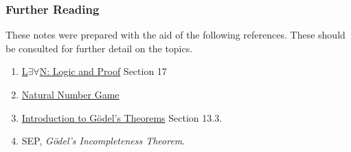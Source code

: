 \documentclass{beamer}
\theoremstyle{indentDefn} \newtheorem{defn}[]{Definition}
\begin{document}
\begin{frame}
	\frametitle{Further Reading}
	
  These notes were prepared with the aid of the following references. 
  These should be consulted for further detail on the topics. 

\begin{enumerate}			
  \item \href{https://leanprover.github.io/logic_and_proof/}{L$\exists \forall$N: Logic and Proof} Section 17
  \item \href{https://www.ma.imperial.ac.uk/~buzzard/xena/natural_number_game/}{Natural Number Game}
  \item \href{https://www.logicmatters.net/igt/}{Introduction to G\"{o}del's Theorems} Section 13.3.	
  \item SEP, \emph{G\"{o}del's Incompleteness Theorem}.
\end{enumerate}
	
\end{frame}
\end{document}
